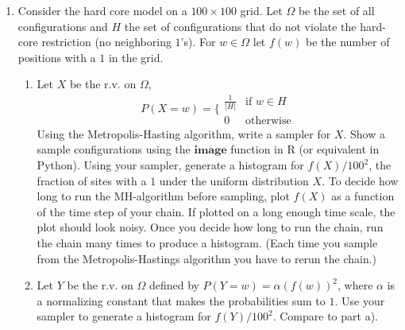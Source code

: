 \documentclass{article}
\begin{document}
\begin{enumerate}
\item Consider the hard core model on a $100 \times 100$ grid.   Let $\Omega$ be the set of all configurations and $H$  the set of configurations that do not violate the hard-core restriction (no neighboring $1$'s).  For $w \in \Omega$ let $f(w)$ be the number of positions with a $1$ in the grid.  
\begin{enumerate}
\item Let $X$ be the r.v. on $\Omega$,
\begin{equation}
P(X=w) = \bigg\{
\begin{array}{cc}
\frac{1}{|H|} & \text{if } w \in H \\
0 & \text{otherwise}
\end{array}
\end{equation}
Using the Metropolis-Hasting algorithm, write a sampler for $X$.  Show a sample configurations using the $\textbf{image}$ function in R (or equivalent in Python).   Using your sampler, generate a histogram for $f(X)/100^2$, the fraction of sites with a $1$ under the uniform distribution $X$.  To decide how long to run the MH-algorithm before sampling, plot $f(X)$ as a function of the time step of your chain.   If plotted on a long enough time scale, the plot should look noisy.   Once you decide how long to run the chain, run the chain many times to produce a histogram.   (Each time you sample from the Metropolis-Hastings algorithm you have to rerun the chain.)
\item Let $Y$ be the r.v. on $\Omega$ defined by $P(Y = w) = \alpha (f(w))^2$, where $\alpha$ is a normalizing constant that makes the probabilities sum to $1$.   Use your sampler to generate a histogram for $f(Y)/100^2$.  Compare to part a).
\end{enumerate}


\end{enumerate}
\end{document}
